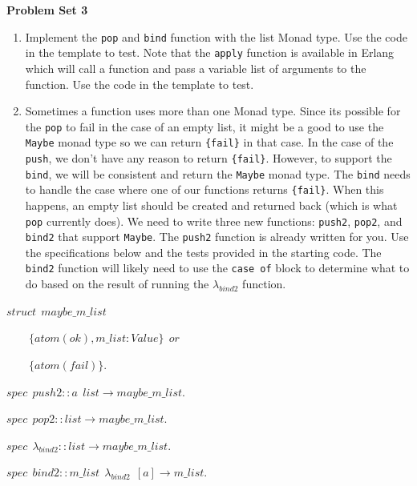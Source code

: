 \documentclass[
]{book}
\begin{document}
\begin{problembox}

\textbf{Problem Set 3}

\begin{enumerate}
\def\labelenumi{\arabic{enumi}.}
\item
  Implement the \texttt{pop} and \texttt{bind} function with the list Monad type. Use the code in the template to test. Note that the \texttt{apply} function is available in Erlang which will call a function and pass a variable list of arguments to the function. Use the code in the template to test.
\item
  Sometimes a function uses more than one Monad type. Since its possible for the \texttt{pop} to fail in the case of an empty list, it might be a good to use the \texttt{Maybe} monad type so we can return \texttt{\{fail\}} in that case. In the case of the \texttt{push}, we don't have any reason to return \texttt{\{fail\}}. However, to support the \texttt{bind}, we will be consistent and return the \texttt{Maybe} monad type. The \texttt{bind} needs to handle the case where one of our functions returns \texttt{\{fail\}}. When this happens, an empty list should be created and returned back (which is what \texttt{pop} currently does). We need to write three new functions: \texttt{push2}, \texttt{pop2}, and \texttt{bind2} that support \texttt{Maybe}. The \texttt{push2} function is already written for you. Use the specifications below and the tests provided in the starting code. The \texttt{bind2} function will likely need to use the \texttt{case\ of} block to determine what to do based on the result of running the \(\lambda_{bind2}\) function.
\end{enumerate}

\begin{formulabox}
\(struct ~ ~ maybe\_m\_list\)

\(\quad \quad \lbrace atom(ok), m\_list:Value \rbrace ~ ~ or\)

\(\quad \quad \lbrace atom(fail) \rbrace.\)

\(spec ~ ~ push2 :: a ~ ~ list \rightarrow maybe\_m\_list.\)

\(spec ~ ~ pop2 :: list \rightarrow maybe\_m\_list.\)

\(spec ~ ~ \lambda_{bind2} :: list \rightarrow maybe\_m\_list.\)

\(spec ~ ~ bind2 :: m\_list ~ ~ \lambda_{bind2} ~ ~ [a] \rightarrow m\_list.\)

\end{formulabox}

\end{problembox}
\end{document}
